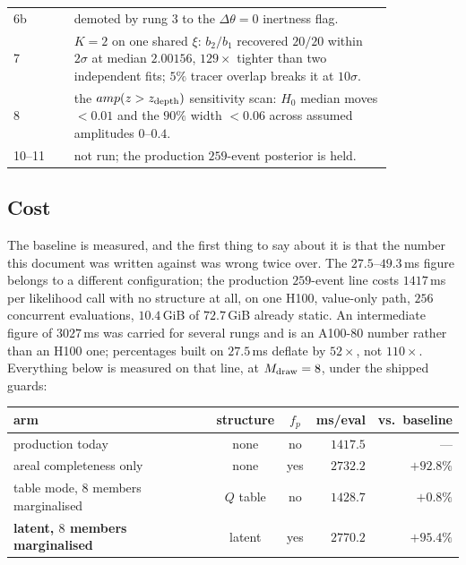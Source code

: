 \documentclass[11pt]{article}
\theoremstyle{definition}
\theoremstyle{remark}
\newcommand{\zdep}{z_{\rm depth}}
\newcommand{\Mdraw}{M_{\rm draw}}
\begin{document}
\begin{center}
\begin{tabular}{@{}lp{0.84\linewidth}@{}}
6b & demoted by rung 3 to the $\Delta\theta=0$ inertness flag. \\
7 & $K=2$ on one shared $\xi$: $b_2/b_1$ recovered $20/20$ within $2\sigma$ at
median $2.00156$, $129\times$ tighter than two independent fits; $5\%$ tracer
overlap breaks it at $10\sigma$. \\
8 & the $amp(z>\zdep)$ sensitivity scan: $H_0$ median moves $<0.01$ and the
$90\%$ width $<0.06$ across assumed amplitudes $0$--$0.4$. \\
10--11 & not run; the production $259$-event posterior is held. \\
\bottomrule
\end{tabular}
\end{center}

\subsection{Cost}
\label{sec:cost}

The baseline is measured, and the first thing to say about it is that the number
this document was written against was wrong twice over. The $27.5$--$49.3$\,ms
figure belongs to a different configuration; the production $259$-event line
costs $1417$\,ms per likelihood call with no structure at all, on one H100,
value-only path, $256$ concurrent evaluations, $10.4$\,GiB of $72.7$\,GiB already
static. An intermediate figure of $3027$\,ms was carried for several rungs and is
an A100-80 number rather than an H100 one; percentages built on $27.5$\,ms
deflate by $52\times$, not $110\times$. Everything below is measured on that
line, at $\Mdraw=8$, under the shipped guards:

\begin{center}\small
\begin{tabular}{lccrr}
\toprule
arm & structure & $f_p$ & ms/eval & vs.\ baseline\\
\midrule
production today & none & no & $1417.5$ & ---\\
areal completeness only & none & yes & $2732.2$ & $+92.8\%$\\
table mode, $8$ members marginalised & $Q$ table & no & $1428.7$ & $+0.8\%$\\
\textbf{latent, $8$ members marginalised} & latent & yes & $2770.2$ & $+95.4\%$\\
\bottomrule
\end{tabular}
\end{center}
\end{document}
